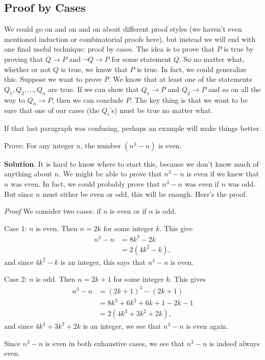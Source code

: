 \documentclass[11pt,]{book}
\makeatletter
\theoremstyle{ptxplainnotitle}
\theoremstyle{ptxplaintitle}
\renewcommand*{\proofname}{Proof}
\renewenvironment{proof}[1][\proofname]{\par
  \pushQED{\qed}%
  \normalfont \topsep6\p@\@plus6\p@\relax
  \trivlist
  \item\relax
    {\itshape
    #1\@addpunct{.}}\hspace\labelsep\ignorespaces
}{%
  \popQED\endtrivlist\@endpefalse
}
\theoremstyle{ptxdefinitionnotitle}
\theoremstyle{ptxdefinitiontitle}
\theoremstyle{ptxdefinitionnotitle}
\theoremstyle{ptxdefinitiontitle}
\theoremstyle{ptxdefinitionnotitle}
\theoremstyle{ptxdefinitiontitle}
\theoremstyle{ptxdefinitiontitlenonumber}
\theoremstyle{ptxdefinitiontitlenonumber}
\numberwithin{equation}{chapter}
\newcommand{\imp}{\rightarrow}
\newcommand{\amp}{&}
\makeatother
\begin{document}
\subsection[{Proof by Cases}]{Proof by Cases}\label{subsection-26}
\hypertarget{p-2593}{}%
%
\par
\hypertarget{p-2594}{}%
We could go on and on and on about different proof styles (we haven't even mentioned induction or combinatorial proofs here), but instead we will end with one final useful technique: proof by cases. The idea is to prove that \(P\) is true by proving that \(Q \imp P\) and \(\neg Q \imp P\) for some statement \(Q\). So no matter what, whether or not \(Q\) is true, we know that \(P\) is true. In fact, we could generalize this. Suppose we want to prove \(P\). We know that at least one of the statements \(Q_1, Q_2, \ldots, Q_n\) are true. If we can show that \(Q_1 \imp P\) and \(Q_2 \imp P\) and so on all the way to \(Q_n \imp P\), then we can conclude \(P\). The key thing is that we want to be sure that one of our cases (the \(Q_i\)'s) must be true no matter what.%
\par
\hypertarget{p-2595}{}%
If that last paragraph was confusing, perhaps an example will make things better.%
\begin{example}\label{example-72}
\hypertarget{p-2596}{}%
Prove: For any integer \(n\), the number \((n^3 -n)\) is even.%
\par\smallskip%
\noindent\textbf{Solution}.\hypertarget{solution-296}{}\quad%
\hypertarget{p-2597}{}%
It is hard to know where to start this, because we don't know much of anything about \(n\). We might be able to prove that \(n^3 - n\) is even if we knew that \(n\) was even. In fact, we could probably prove that \(n^3-n\) was even if \(n\) was odd. But since \(n\) must either be even or odd, this will be enough. Here's the proof.%
\begin{proof}\hypertarget{proof-33}{}
\hypertarget{p-2598}{}%
We consider two cases: if \(n\) is even or if \(n\) is odd.%
\par
\hypertarget{p-2599}{}%
Case 1: \(n\) is even. Then \(n = 2k\) for some integer \(k\). This give%
\begin{align*}
n^3 - n \amp = 8k^3 - 2k\\
\amp = 2(4k^2 - k),
\end{align*}
and since \(4k^2 - k\) is an integer, this says that \(n^3-n\) is even.%
\par
\hypertarget{p-2600}{}%
Case 2: \(n\) is odd. Then \(n = 2k+1\) for some integer \(k\). This gives%
\begin{align*}
n^3 - n \amp = (2k+1)^3 - (2k+1)\\
\amp = 8k^3 + 6k^2 + 6k + 1 - 2k - 1\\
\amp = 2(4k^3 + 3k^2 + 2k),
\end{align*}
and since \(4k^3 + 3k^2 + 2k\) is an integer, we see that \(n^3 - n\) is even again.%
\par
\hypertarget{p-2601}{}%
Since \(n^3 - n\) is even in both exhaustive cases, we see that \(n^3 - n\) is indeed always even.%
\end{proof}
\end{example}
\end{document}
